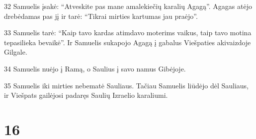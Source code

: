 \par 32 Samuelis įsakė: “Atveskite pas mane amalekiečių karalių Agagą”. Agagas atėjo drebėdamas pas jį ir tarė: “Tikrai mirties kartumas jau praėjo”. 
\par 33 Samuelis tarė: “Kaip tavo kardas atimdavo moterims vaikus, taip tavo motina tepasilieka bevaikė”. Ir Samuelis sukapojo Agagą į gabalus Viešpaties akivaizdoje Gilgale. 
\par 34 Samuelis nuėjo į Ramą, o Saulius­ į savo namus Gibėjoje. 
\par 35 Samuelis iki mirties nebematė Sauliaus. Tačiau Samuelis liūdėjo dėl Sauliaus, ir Viešpats gailėjosi padaręs Saulių Izraelio karaliumi.



\chapter{16}


